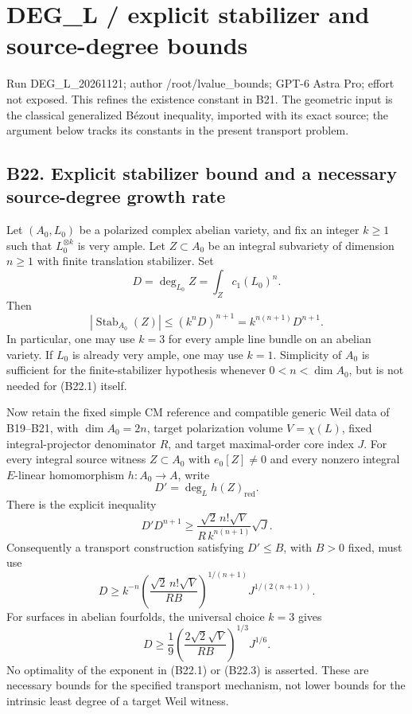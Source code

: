 \documentclass[11pt,a4paper]{article}
\providecommand{\tightlist}{\setlength{\itemsep}{0pt}\setlength{\parskip}{0pt}}
\theoremstyle{definition}
\begin{document}
\providecommand{\tightlist}{\setlength{\itemsep}{0pt}\setlength{\parskip}{0pt}}
\section{DEG\_L / explicit stabilizer and source-degree bounds}\label{deg_l-explicit-stabilizer-and-source-degree-bounds}

Run DEG\_L\_20261121; author /root/lvalue\_bounds; GPT-6 Astra Pro; effort not exposed. This refines the existence constant in B21. The geometric input is the classical generalized Bézout inequality, imported with its exact source; the argument below tracks its constants in the present transport problem.

\subsection{B22. Explicit stabilizer bound and a necessary source-degree growth rate}\label{b22.-explicit-stabilizer-bound-and-a-necessary-source-degree-growth-rate}

Let \((A_0,L_0)\) be a polarized complex abelian variety, and fix an integer \(k\ge1\) such that \(L_0^{\otimes k}\) is very ample. Let \(Z\subset A_0\) be an integral subvariety of dimension \(n\ge1\) with finite translation stabilizer. Set \[
 D=\deg_{L_0}Z=\int_Zc_1(L_0)^n.
\] Then \[
 |\operatorname{Stab}_{A_0}(Z)|
 \le (k^nD)^{n+1}
 =k^{n(n+1)}D^{n+1}.
\tag{B22.1}
\] In particular, one may use \(k=3\) for every ample line bundle on an abelian variety. If \(L_0\) is already very ample, one may use \(k=1\). Simplicity of \(A_0\) is sufficient for the finite-stabilizer hypothesis whenever \(0<n<\dim A_0\), but is not needed for (B22.1) itself.

Now retain the fixed simple CM reference and compatible generic Weil data of B19--B21, with \(\dim A_0=2n\), target polarization volume \(V=\chi(L)\), fixed integral-projector denominator \(R\), and target maximal-order core index \(J\). For every integral source witness \(Z\subset A_0\) with \(e_0[Z]\ne0\) and every nonzero integral \(E\)-linear homomorphism \(h:A_0\to A\), write \[
 D'=\deg_Lh(Z)_{\mathrm{red}}.
\] There is the explicit inequality \[
 D'D^{n+1}
 \ge
 \frac{\sqrt2\,n!\sqrt V}{R\,k^{n(n+1)}}\sqrt J.
\tag{B22.2}
\] Consequently a transport construction satisfying \(D'\le B\), with \(B>0\) fixed, must use \[
 D\ge k^{-n}
 \left(\frac{\sqrt2\,n!\sqrt V}{RB}\right)^{1/(n+1)}
 J^{1/(2(n+1))}.
\tag{B22.3}
\] For surfaces in abelian fourfolds, the universal choice \(k=3\) gives \[
 D\ge\frac19
 \left(\frac{2\sqrt2\sqrt V}{RB}\right)^{1/3}J^{1/6}.
\tag{B22.4}
\] No optimality of the exponent in (B22.1) or (B22.3) is asserted. These are necessary bounds for the specified transport mechanism, not lower bounds for the intrinsic least degree of a target Weil witness.
\end{document}
